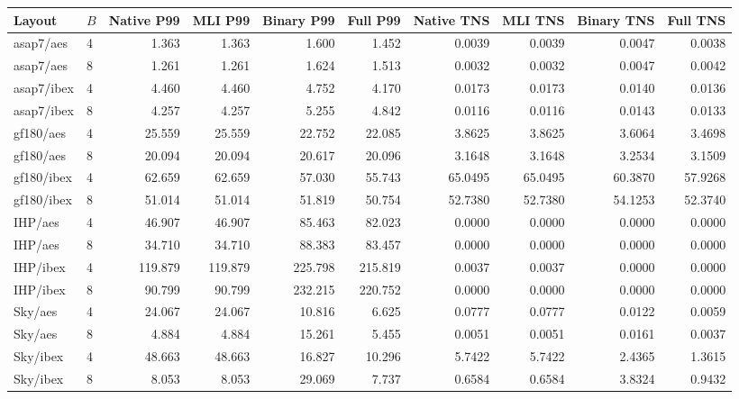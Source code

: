 \begin{tabular}{llrrrrrrrr}
\toprule
Layout & $B$ & Native P99 & MLI P99 & Binary P99 & Full P99 & Native TNS & MLI TNS & Binary TNS & Full TNS \\
\midrule
asap7/aes & 4 & 1.363 & 1.363 & 1.600 & 1.452 & 0.0039 & 0.0039 & 0.0047 & 0.0038 \\
asap7/aes & 8 & 1.261 & 1.261 & 1.624 & 1.513 & 0.0032 & 0.0032 & 0.0047 & 0.0042 \\
asap7/ibex & 4 & 4.460 & 4.460 & 4.752 & 4.170 & 0.0173 & 0.0173 & 0.0140 & 0.0136 \\
asap7/ibex & 8 & 4.257 & 4.257 & 5.255 & 4.842 & 0.0116 & 0.0116 & 0.0143 & 0.0133 \\
gf180/aes & 4 & 25.559 & 25.559 & 22.752 & 22.085 & 3.8625 & 3.8625 & 3.6064 & 3.4698 \\
gf180/aes & 8 & 20.094 & 20.094 & 20.617 & 20.096 & 3.1648 & 3.1648 & 3.2534 & 3.1509 \\
gf180/ibex & 4 & 62.659 & 62.659 & 57.030 & 55.743 & 65.0495 & 65.0495 & 60.3870 & 57.9268 \\
gf180/ibex & 8 & 51.014 & 51.014 & 51.819 & 50.754 & 52.7380 & 52.7380 & 54.1253 & 52.3740 \\
IHP/aes & 4 & 46.907 & 46.907 & 85.463 & 82.023 & 0.0000 & 0.0000 & 0.0000 & 0.0000 \\
IHP/aes & 8 & 34.710 & 34.710 & 88.383 & 83.457 & 0.0000 & 0.0000 & 0.0000 & 0.0000 \\
IHP/ibex & 4 & 119.879 & 119.879 & 225.798 & 215.819 & 0.0037 & 0.0037 & 0.0000 & 0.0000 \\
IHP/ibex & 8 & 90.799 & 90.799 & 232.215 & 220.752 & 0.0000 & 0.0000 & 0.0000 & 0.0000 \\
Sky/aes & 4 & 24.067 & 24.067 & 10.816 & 6.625 & 0.0777 & 0.0777 & 0.0122 & 0.0059 \\
Sky/aes & 8 & 4.884 & 4.884 & 15.261 & 5.455 & 0.0051 & 0.0051 & 0.0161 & 0.0037 \\
Sky/ibex & 4 & 48.663 & 48.663 & 16.827 & 10.296 & 5.7422 & 5.7422 & 2.4365 & 1.3615 \\
Sky/ibex & 8 & 8.053 & 8.053 & 29.069 & 7.737 & 0.6584 & 0.6584 & 3.8324 & 0.9432 \\
\bottomrule
\end{tabular}
